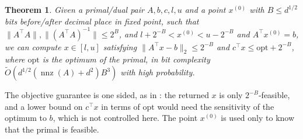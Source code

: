 \documentclass[11pt]{article}
\newtheorem{theorem}{Theorem}
\newcommand{\nnz}{\operatorname{nnz}}
\renewcommand{\O}{\widetilde O}
\newcommand{\xini}{x^{(0)}}
\begin{document}
\begin{theorem}
\label{thm:main}
Given a primal/dual pair $A,b,c,l,u$ and a point
$\xini$ with
$B \le d^{1/2}$ bits before/after decimal place in fixed point, such that
$\|A^{\top} A\|, \|(A^{\top}A)^{-1}\| \leq 2^{B}$, and
$l + 2^{-B} < \xini < u - 2^{-B}$ and
$A^\top \xini = b$, we can compute
$x\in[l,u]$ satisfying
$\|A^\top x-b\|_2\leq 2^{-B}$ and
$c^\top x \le \mathrm{opt} + 2^{-B}$, where
$\mathrm{opt}$ is the optimum of the primal, in bit complexity
$\O(d^{1/2} ( \nnz(A) + d^2 ) B^{3})$ with high probability.
\end{theorem}

The objective guarantee is one sided, as in
\cite{LS15,BLLSSSW21}: the
returned $x$ is only
$2^{-B}$-feasible, and a lower bound on
$c^\top x$ in terms of
$\mathrm{opt}$ would need the sensitivity of the optimum to
$b$, which is not controlled here.
The point $\xini$ is used only to know that the primal is feasible.
\end{document}
